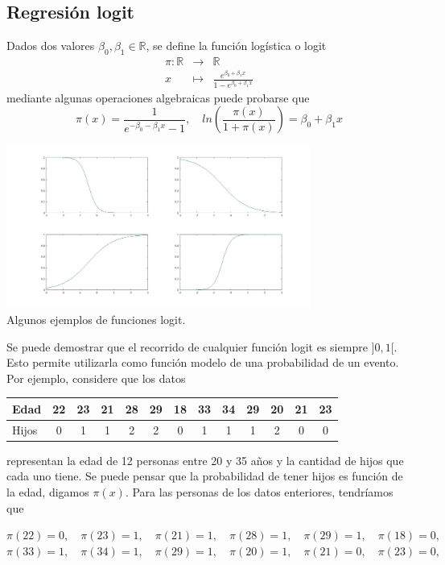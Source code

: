 \documentclass[letterpaper,11pt]{article}
\begin{document}
\subsection{Regresi\'on logit}
Dados dos valores $\beta_0,\beta_1\in\mathbb{R}$, se define la funci\'on log\'istica o logit
$$
\begin{array}{rcl}
\pi:\mathbb{R} & \longrightarrow & \mathbb{R} \\
x & \longmapsto &\displaystyle\frac{e^{\beta_0+\beta_1x}}{1-e^{\beta_0+\beta_1x}} 
\end{array}
$$
mediante algunas operaciones algebraicas puede probarse que
$$
\displaystyle
\pi(x)=\frac{1}{e^{-\beta_0-\beta_1x}-1}, \quad
ln\left(\frac{\pi(x)}{1+\pi(x)}\right)=\beta_0+\beta_1x
$$
\begin{center}
\includegraphics[width=0.75\textwidth]{./logits.jpg}\\
\vspace{-5mm}
Algunos ejemplos de funciones logit.
\end{center}
Se puede demostrar que el recorrido de cualquier funci\'on logit es siempre $]0,1[$. Esto permite utilizarla como funci\'on modelo de una probabilidad de un evento. Por ejemplo, considere que los datos
\begin{center}\small
\begin{tabular}{|l|c|c|c|c|c|c|c|c|c|c|c|c|}\hline
Edad &22   &23  &21  &28  &29 &18 &33 &34 &29 &20 &21& 23 \\\hline
Hijos &0 &1 &1 &2 &2 &0 &1 &1 &1 &2 &0 &0 \\\hline
\end{tabular}
\end{center}
representan la edad de 12 personas entre 20 y 35 a\~{n}os y la cantidad de hijos que cada uno tiene. Se puede pensar que la probabilidad de tener hijos es funci\'on de la edad, digamos $\pi(x)$. Para las personas de los datos enteriores, tendr\'iamos que
\begin{center}
$
\pi(22)=0, \quad 
\pi(23)=1, \quad 
\pi(21)=1, \quad 
\pi(28)=1, \quad 
\pi(29)=1, \quad 
\pi(18)=0, 
$\\
$
\pi(33)=1, \quad 
\pi(34)=1, \quad
\pi(29)=1, \quad 
\pi(20)=1, \quad 
\pi(21)=0, \quad 
\pi(23)=0, \quad 
$
\end{center}
\end{document}
